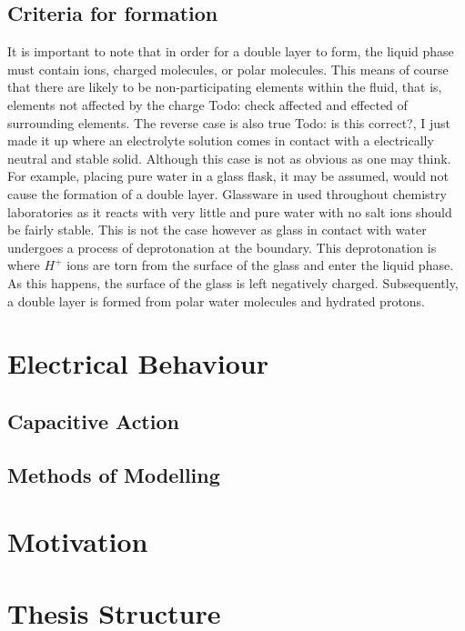 \subsection{Criteria for formation}

    It is important to note that in order for a double layer to form, the liquid phase must contain ions, charged molecules, or polar molecules. This means of course that there are likely to be non-participating elements within the fluid, that is, elements not affected by the charge {Todo: check affected and effected} of surrounding elements.
    The reverse case is also true {Todo: is this correct?, I just made it up} where an electrolyte solution comes in contact with a electrically neutral and stable solid. Although this case is not as obvious as one may think. For example, placing pure water in a glass flask, it may be assumed, would not cause the formation of a double layer. Glassware in used throughout chemistry laboratories as it reacts with very little and pure water with no salt ions should be fairly stable. This is not the case however as glass in contact with water undergoes a process of deprotonation at the boundary. This deprotonation is where $H^{+}$ ions are torn from the surface of the glass and enter the liquid phase. As this happens, the surface of the glass is left negatively charged. Subsequently, a double layer is formed from polar water molecules and hydrated protons.


\section{Electrical Behaviour}

    \subsection{Capacitive Action}
    \subsection{Methods of Modelling}


\section{Motivation}
\section{Thesis Structure}